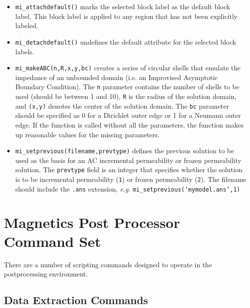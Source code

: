 \begin{itemize}
\item{\tt mi\_attachdefault()} marks the
selected block label as the default block label.  This block label
is applied to any region that has not been explicitly labeled.

\item{\tt mi\_detachdefault()} undefines the default
attribute for the selected block labels.

\item{\tt mi\_makeABC(n,R,x,y,bc)} creates a series of circular shells that emulate the
impedance of an unbounded domain (i.e. an Improvised Asymptotic Boundary
Condition).  The {\tt n} parameter contains the number of shells to be used
(should be between 1 and 10), {\tt R} is the radius of the solution domain, and
{\tt (x,y)} denotes the center of the solution domain.  The {\tt bc} parameter should
be specified as 0 for a Dirichlet outer edge or 1 for a Neumann outer edge.
If the function is called without all the parameters, the function makes up
reasonable values for the missing parameters.

\item{\tt mi\_setprevious(filename,prevtype)} defines the previous solution to be used as the basis for an AC incremental
permeability or frozen permeability solution.  The {\tt prevtype} field is an integer that specifies whether the solution 
is to be incremental permeability ({\tt 1}) or frozen permeability ({\tt 2}). The filename should include the {\tt .ans}
extension, {\em e.g.} {\tt mi\_setprevious('mymodel.ans',1)}

\end{itemize}

\section{Magnetics Post Processor Command Set}

There are a number of scripting commands designed to operate in
the postprocessing environment.

\subsection{Data Extraction Commands}

